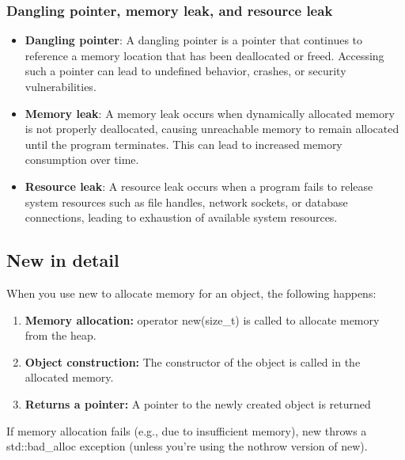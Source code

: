 \documentclass{report}
\begin{document}
    \bigbreak \noindent 
    \subsubsection{Dangling pointer, memory leak, and resource leak}
    \begin{itemize}
        \item \textbf{Dangling pointer}: A dangling pointer is a pointer that continues to reference a memory location that has been deallocated or freed. Accessing such a pointer can lead to undefined behavior, crashes, or security vulnerabilities.
        \item \textbf{Memory leak}: A memory leak occurs when dynamically allocated memory is not properly deallocated, causing unreachable memory to remain allocated until the program terminates. This can lead to increased memory consumption over time.
        \item \textbf{Resource leak}: A resource leak occurs when a program fails to release system resources such as file handles, network sockets, or database connections, leading to exhaustion of available system resources.
    \end{itemize}

    \bigbreak \noindent 
    \subsection{New in detail}
    \bigbreak \noindent 
    When you use new to allocate memory for an object, the following happens:
    \begin{enumerate}
        \item \textbf{Memory allocation:} operator new(size\_t) is called to allocate memory from the heap.
        \item \textbf{Object construction:} The constructor of the object is called in the allocated memory.
        \item \textbf{Returns a pointer:} A pointer to the newly created object is returned
    \end{enumerate}
    \bigbreak \noindent 
    If memory allocation fails (e.g., due to insufficient memory), new throws a std::bad\_alloc exception (unless you're using the nothrow version of new).

    \bigbreak \noindent 
\end{document}

